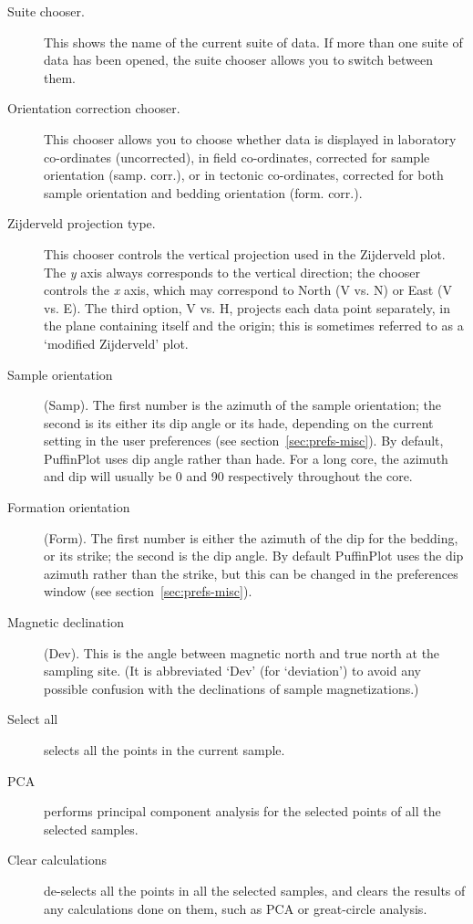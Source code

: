 \documentclass[a4paper,british]{article}
\newcommand{\ppcmd}[1]{\textsf{#1}} %
\newcommand{\caps}[1]{\MakeTextUppercase{#1}} %
\begin{document}
\begin{description}

\item[Suite chooser.] This shows the name of the current suite of data. If
  more than one suite of data has been opened, the suite chooser allows you
  to switch between them.

\item[Orientation correction chooser.] This chooser allows you to choose
  whether data is displayed in laboratory co-ordinates (\ppcmd{uncorrected}),
  in field co-ordinates, corrected for sample orientation (\ppcmd{samp.
    corr.}), or in tectonic co-ordinates, corrected for both sample
  orientation and bedding orientation (\ppcmd{form. corr.}).

\item[Zijderveld projection type.] This chooser controls the vertical
  projection used in the Zijderveld plot. The {\em y} axis always corresponds
  to the vertical direction; the chooser controls the {\em x} axis, which may
  correspond to North (\ppcmd{V vs. N}) or East (\ppcmd{V vs. E}). The third
  option, \ppcmd{V vs. H}, projects each data point separately, in the plane
  containing itself and the origin; this is sometimes referred to as a
  `modified Zijderveld' plot.

\item[Sample orientation] (\ppcmd{Samp}). The first number is the azimuth of
  the sample orientation; the second is its either its dip angle or its hade,
  depending on the current setting in the user preferences (see
  section~\ref{sec:prefs-misc}). By default, PuffinPlot uses dip angle rather
  than hade. For a long core, the azimuth and dip will usually be 0 and 90
  respectively throughout the core.

\item[Formation orientation] (\ppcmd{Form}). The first number is either the
  azimuth of the dip for the bedding, or its strike; the second is the dip
  angle. By default PuffinPlot uses the dip azimuth rather than the strike,
  but this can be changed in the preferences window (see
  section~\ref{sec:prefs-misc}).

\item[Magnetic declination] (\ppcmd{Dev}). This is the angle between magnetic
  north and true north at the sampling site. (It is abbreviated `Dev' (for
  `deviation') to avoid any possible confusion with the declinations of
  sample magnetizations.)

\item[Select all] selects all the points in the current sample.

\item[\caps{Pca}] performs principal component analysis for the selected
  points of all the selected samples.

\item[Clear calculations] de-selects all the points in all the selected
  samples, and clears the results of any calculations done on them, such as
  \caps{pca} or great-circle analysis.

\end{description}
\end{document}
